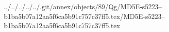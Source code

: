 ../../../../../.git/annex/objects/89/Qg/MD5E-s5223--b1ba5b07a12aa5f6ca5b91c757c37ff5.tex/MD5E-s5223--b1ba5b07a12aa5f6ca5b91c757c37ff5.tex